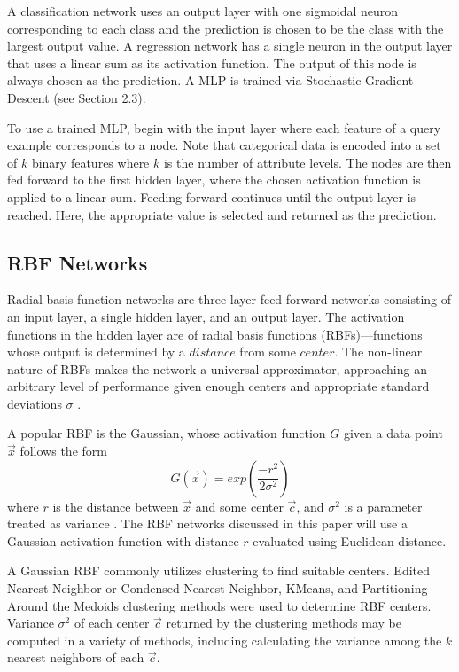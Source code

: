 \documentclass[twoside,10pt]{article}
\begin{document}
A classification network uses an output layer with one sigmoidal neuron corresponding to each class and the prediction is chosen to be the class with the largest output value. A regression network has a single neuron in the output layer that uses a linear sum as its activation function. The output of this node is always chosen as the prediction.
A MLP is trained via Stochastic Gradient Descent (see Section 2.3).

To use a trained MLP, begin with the input layer where each feature of a query example corresponds to a node. Note that categorical data is encoded into a set of $k$ binary features where $k$ is the number of attribute levels.
The nodes are then fed forward to the first hidden layer, where the chosen activation function is applied to a linear sum. Feeding forward continues until the output layer is reached. Here, the appropriate value is selected and returned as the prediction.

\subsection{RBF Networks}
	Radial basis function networks are three layer feed forward networks consisting of an input layer, a single hidden layer, and an output layer. The activation functions in the hidden layer are of radial basis functions (RBFs)---functions whose output is determined by a $distance$ from some $center$. The non-linear nature of RBFs makes the network a universal approximator, approaching an arbitrary level of performance given enough centers and appropriate standard deviations $\sigma$ \citep{rbf}.

	A popular RBF is the Gaussian, whose activation function $G$ given a data point $\vec{x}$ follows the form
	$$G(\vec{x}) = exp({\frac{-r^2}{2\sigma^2}})$$
	where $r$ is the distance between $\vec x$ and some center $\vec c$, and $\sigma^2$ is a parameter treated as variance \citep{rbfintro}. The RBF networks discussed in this paper will use a Gaussian activation function with distance $r$ evaluated using Euclidean distance.

	A Gaussian RBF commonly utilizes clustering to find suitable centers. Edited Nearest Neighbor or Condensed Nearest Neighbor, KMeans, and Partitioning Around the Medoids clustering methods were used to determine RBF centers. Variance $\sigma^2$ of each center $\vec c$ returned by the clustering methods may be computed in a variety of methods, including calculating the variance among the $k$ nearest neighbors of each $\vec c$.
\end{document}

